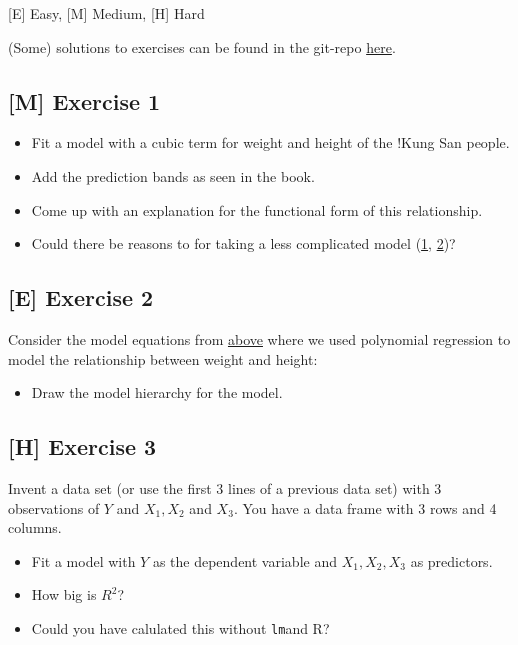 \documentclass[
]{book}
\providecommand{\tightlist}{%
  \setlength{\itemsep}{0pt}\setlength{\parskip}{0pt}}
\begin{document}
{[}E{]} Easy, {[}M{]} Medium, {[}H{]} Hard

(Some) solutions to exercises can be found in the git-repo \href{https://github.com/jdegenfellner/Script_QM2_ZHAW/tree/main/Solutions_Exercises}{here}.

\subsection{{[}M{]} Exercise 1}\label{exercise1_multiple_regression}

\begin{itemize}
\tightlist
\item
  Fit a model with a cubic term for weight and height of the !Kung San people.
\item
  Add the prediction bands as seen in the book.
\item
  Come up with an explanation for the functional form of this relationship.
\item
  Could there be reasons to for taking a less complicated model
  (\href{https://en.wikipedia.org/wiki/Statistical_model_specification}{1}, \href{https://en.wikipedia.org/wiki/Occam\%27s_razor}{2})?
\end{itemize}

\subsection{{[}E{]} Exercise 2}\label{exercise2_multiple_regression}

Consider the model equations from \hyperref[adding_transformed_predictor_bayes]{above}
where we used polynomial regression to model the relationship between
weight and height:

\begin{itemize}
\tightlist
\item
  Draw the model hierarchy for the model.
\end{itemize}

\subsection{{[}H{]} Exercise 3}\label{exercise3_multiple_regression}

Invent a data set (or use the first 3 lines of a previous data set)
with 3 observations of \(Y\) and \(X_1, X_2\) and \(X_3\). You have a data frame
with 3 rows and 4 columns.

\begin{itemize}
\tightlist
\item
  Fit a model with \(Y\) as the dependent variable and \(X_1, X_2, X_3\) as predictors.
\item
  How big is \(R^2\)?
\item
  Could you have calulated this without \texttt{lm}and R?
\end{itemize}
\end{document}
